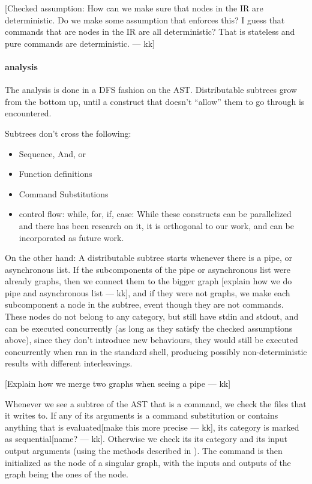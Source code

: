 \documentclass[sigplan,10pt,review,anonymous]{acmart}
\newcommand{\kk}[1]{[{\color{magenta}#1 --- kk}]}
\begin{document}
\kk{Checked assumption: How can we make sure that nodes in the IR are
  deterministic. Do we make some assumption that enforces this? I
  guess that commands that are nodes in the IR are all deterministic?
  That is stateless and pure commands are deterministic.}

\paragraph{analysis}

The analysis is done in a DFS fashion on the AST. Distributable
subtrees grow from the bottom up, until a construct that doesn't
``allow'' them to go through is encountered.


Subtrees don't cross the following:

\begin{itemize}
\item Sequence, And,  or
\item Function definitions
\item Command Substitutions
\item control flow: while, for, if, case: While these constructs can
  be parallelized and there has been research on it, it is orthogonal
  to our work, and can be incorporated as future work.
\end{itemize}

On the other hand: A distributable subtree starts whenever there is a
pipe, or asynchronous list. If the subcomponents of the pipe or
asynchronous list were already graphs, then we connect them to the
bigger graph \kk{explain how we do pipe and asynchronous list}, and if
they were not graphs, we make each subcomponent a node in the subtree,
event though they are not commands. These nodes do not belong to any
category, but still have stdin and stdout, and can be executed
concurrently (as long as they satisfy the checked assumptions above),
since they don't introduce new behaviours, they would still be
executed concurrently when ran in the standard shell, producing
possibly non-deterministic results with different interleavings.

\kk{Explain how we merge two graphs when seeing a pipe}

Whenever we see a subtree of the AST that is a command, we check the
files that it writes to. If any of its arguments is a command
substitution or contains anything that is evaluated\kk{make this more
  precise}, its category is marked as sequential\kk{name?}. Otherwise
we check its its category and its input output arguments (using the
methods described in ). The command is then initialized as
the node of a singular graph, with the inputs and outputs of the graph
being the ones of the node.
\end{document}
